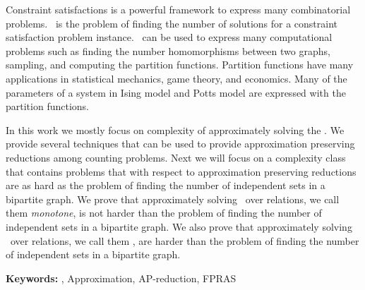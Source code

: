 
%
%

Constraint satisfactions is a powerful framework to express many combinatorial problems. 
\ccsp\ is the problem of finding the number of solutions for a constraint satisfaction problem instance.
\ccsp\ can be used to express many computational problems such as finding the number homomorphisms
between two graphs, sampling, and computing the partition functions.
Partition functions have many applications in statistical mechanics,
game theory, and economics. Many of the parameters of a system in Ising model and Potts model 
are expressed with the partition functions.

In this work we mostly focus on complexity of approximately solving the \ccsp\@.
We provide several techniques that
can be used to provide approximation preserving reductions among counting problems.
Next we will focus on 
a complexity class that contains problems that with respect to approximation preserving reductions
are as hard as the problem of finding the number of independent
sets in a bipartite graph. We prove that approximately solving \ccsp\ over relations, we call them
\emph{monotone}, is not harder than the problem of
finding the number of independent sets in a bipartite graph. We also prove that
approximately solving \ccsp\ over relations, we call them \emph{\RBA},
are harder than the problem of finding the number of independent sets in a bipartite graph.

\vspace{1cm}

\noindent \textbf{Keywords:} \ccsp, Approximation, AP-reduction, FPRAS







